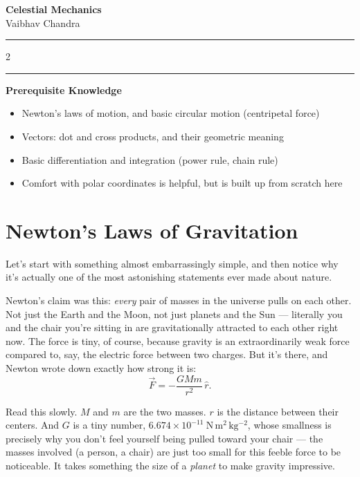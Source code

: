 \documentclass[11pt]{article}
\begin{document}
\begin{titlepage}
\begin{center}
{\Huge \textbf{Celestial Mechanics}}\\\vspace{0.5cm}
{\Large Vaibhav Chandra}
\end{center}

\vspace{0.8cm}
\hrule

\vspace{0.4cm}
\begin{multicols}{2}
  \tableofcontents
\end{multicols}

\vspace{0.4cm}
\hrule

\vspace{0.8cm}
\noindent\textbf{Prerequisite Knowledge}
\begin{itemize}
  \item Newton's laws of motion, and basic circular motion (centripetal force)
  \item Vectors: dot and cross products, and their geometric meaning
  \item Basic differentiation and integration (power rule, chain rule)
  \item Comfort with polar coordinates is helpful, but is built up from scratch here
\end{itemize}

\end{titlepage}

\section{Newton's Laws of Gravitation}

Let's start with something almost embarrassingly simple, and then notice why it's actually one of
the most astonishing statements ever made about nature.

Newton's claim was this: \emph{every} pair of masses in the universe pulls on each other. Not just
the Earth and the Moon, not just planets and the Sun --- literally you and the chair you're
sitting in are gravitationally attracted to each other right now. The force is tiny, of course,
because gravity is an extraordinarily weak force compared to, say, the electric force between two
charges. But it's there, and Newton wrote down exactly how strong it is:
\[
\vec F = -\frac{GMm}{r^2}\,\hat r.
\]

Read this slowly. $M$ and $m$ are the two masses. $r$ is the distance between their centers. And
$G$ is a tiny number, $6.674\times10^{-11}\ \mathrm{N\,m^2\,kg^{-2}}$, whose smallness is precisely
why you don't feel yourself being pulled toward your chair --- the masses involved (a person, a
chair) are just too small for this feeble force to be noticeable. It takes something the size of a
\emph{planet} to make gravity impressive.
\end{document}
